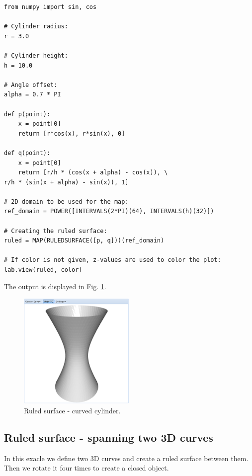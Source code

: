 \documentclass[article,A4,12pt]{llncs}
\begin{document}
\begin{verbatim}
from numpy import sin, cos

# Cylinder radius:
r = 3.0

# Cylinder height:
h = 10.0

# Angle offset:
alpha = 0.7 * PI

def p(point):
    x = point[0]
    return [r*cos(x), r*sin(x), 0]
  
def q(point):
    x = point[0]
    return [r/h * (cos(x + alpha) - cos(x)), \
r/h * (sin(x + alpha) - sin(x)), 1]

# 2D domain to be used for the map:  
ref_domain = POWER([INTERVALS(2*PI)(64), INTERVALS(h)(32)])

# Creating the ruled surface:
ruled = MAP(RULEDSURFACE([p, q]))(ref_domain)

# If color is not given, z-values are used to color the plot:
lab.view(ruled, color)
\end{verbatim}
The output is displayed in Fig. \ref{fig:curves-9}.

\begin{figure}[!ht]
\begin{center}
\includegraphics[width=0.5\textwidth]{img/curves-9.png}
\end{center}
\vspace{-2mm}
\caption{Ruled surface - curved cylinder.}
\label{fig:curves-9}
\end{figure}

\subsection{Ruled surface - spanning two 3D curves}

In this exacle we define two 3D curves and create a ruled surface
between them. Then we rotate it four times to create a closed object.
\end{document}
